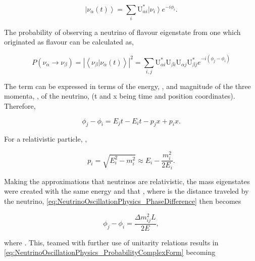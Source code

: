 \begin{equation}
  \label{eq:NeutrinoOscillationPhysics_TimeDepSuperposition}
  \left|\nu_{\alpha}(t)\right> = \sum_{i}\mathrm{U}^{*}_{\alpha i}\left|\nu_{i}\right>e^{-i \phi_{i}}.
\end{equation}

The probability of observing a neutrino of flavour eigenstate \quickmath{\beta} from one which originated as flavour \quickmath{\alpha} can be calculated as,

\begin{equation}
  \label{eq:NeutrinoOscillationPhysics_ProbabilityComplexForm}
  P(\nu_{\alpha} \rightarrow \nu_{\beta}) = \left| \left< \nu_{\beta} | \nu_{\alpha}(t) \right> \right|^{2} = \sum_{i,j} \mathrm{U}^{*}_{\alpha i}\mathrm{U}_{\beta i}\mathrm{U}_{\alpha j}\mathrm{U}^{*}_{\beta j} e^{-i(\phi_{j}-\phi_{i})}
\end{equation}

The  term can be expressed in terms of the energy, , and magnitude of the three momenta, , of the neutrino,  (t and x being time and position coordinates). Therefore,

\begin{equation}
  \label{eq:NeutrinoOscillationPhysics_PhaseDifference}
  \phi_{j}-\phi_{i} = E_{j}t - E_{i}t - p_{j}x + p_{i}x .
\end{equation}

For a relativistic particle, ,

\begin{equation}
  p_{i} = \sqrt{E^{2}_{i} - m^{2}_{i}} \approx E_{i} - \frac{m^{2}_{i}}{2E_{i}}.
\end{equation}

Making the approximations that neutrinos are relativistic, the mass eigenstates were created with the same energy and that , where  is the distance traveled by the neutrino, \autoref{eq:NeutrinoOscillationPhysics_PhaseDifference} then becomes

\begin{equation}
  \phi_{j}-\phi_{i} = \frac{\Delta m^{2}_{ij} L}{2E},
\end{equation}

where . This, teamed with further use of unitarity relations results in \autoref{eq:NeutrinoOscillationPhysics_ProbabilityComplexForm} becoming

